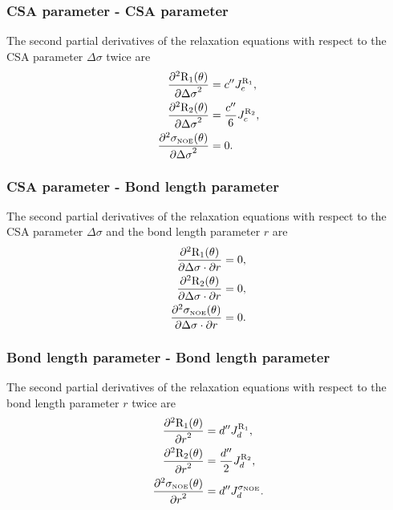 \subsubsection{CSA parameter - CSA parameter}

The second partial derivatives of the relaxation equations with respect to the CSA parameter $\Delta\sigma$ twice are
\begin{align}
    \frac{\partial^2 \mathrm{R}_1(\theta)}{{\partial \Delta\sigma}^2} &= c'' J_c^{\mathrm{R}_1},              \label{eq: Ri': d2R1/dCSA2} \\
    \frac{\partial^2 \mathrm{R}_2(\theta)}{{\partial \Delta\sigma}^2} &= \frac{c''}{6} J_c^{\mathrm{R}_2},    \label{eq: Ri': d2R2/dCSA2} \\
    \frac{\partial^2 \sigma_{\scriptscriptstyle \mathrm{NOE}}(\theta)}{{\partial \Delta\sigma}^2} &= 0.                   \label{eq: Ri': d2sigmaNOE/dCSA2}
\end{align}


\subsubsection{CSA parameter - Bond length parameter}

The second partial derivatives of the relaxation equations with respect to the CSA parameter $\Delta\sigma$ and the bond length parameter $r$ are
\begin{align}
    \frac{\partial^2 \mathrm{R}_1(\theta)}{\partial \Delta\sigma \cdot \partial r} &= 0,         \label{eq: Ri': d2R1/dCSA.dr} \\
    \frac{\partial^2 \mathrm{R}_2(\theta)}{\partial \Delta\sigma \cdot \partial r} &= 0,         \label{eq: Ri': d2R2/dCSA.dr} \\
    \frac{\partial^2 \sigma_{\scriptscriptstyle \mathrm{NOE}}(\theta)}{\partial \Delta\sigma \cdot \partial r} &= 0.  \label{eq: Ri': d2sigmaNOE/dCSA.dr}
\end{align}


\subsubsection{Bond length parameter - Bond length parameter}

The second partial derivatives of the relaxation equations with respect to the bond length parameter $r$ twice are
\begin{align}
    \frac{\partial^2 \mathrm{R}_1(\theta)}{{\partial r}^2} &= d'' J_d^{\mathrm{R}_1},                 \label{eq: Ri': d2R1/dr2} \\
    \frac{\partial^2 \mathrm{R}_2(\theta)}{{\partial r}^2} &= \frac{d''}{2} J_d^{\mathrm{R}_2},       \label{eq: Ri': d2R2/dr2} \\
    \frac{\partial^2 \sigma_{\scriptscriptstyle \mathrm{NOE}}(\theta)}{{\partial r}^2} &= d'' J_d^{\sigma_{\scriptscriptstyle \mathrm{NOE}}}.   \label{eq: Ri': d2sigmaNOE/dr2}
\end{align}



